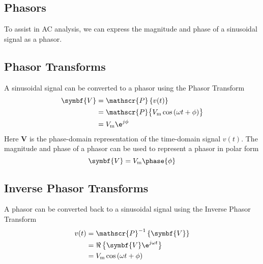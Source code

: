 \documentclass{article}
\begin{document}
\subsection{Phasors}
\begin{definition}
    To assist in AC analysis, we can express the magnitude and phase of a sinusoidal signal
    as a phasor.
\end{definition}
\subsection{Phasor Transforms}
\begin{definition}
    A sinusoidal signal can be converted to a phasor using the Phasor Transform
    \begin{align*}
        \symbf{V} & = \mathscr{P}\left\{ v(t) \right\}                                              \\
                  & = \mathscr{P}\bigl\{ V_{\mathrm{m}}\cos{\left( \omega t + \phi \right)} \bigr\} \\
                  & = V_{\mathrm{m}} \e^{j\phi}
    \end{align*}
    Here $\symbf{V}$ is the phase-domain representation of the
    time-domain signal $v(t)$.
    The magnitude and phase of a phasor can be used to represent a phasor in polar form
    \begin{equation*}
        \symbf{V} = V_{\mathrm{m}} \phase{\phi}
    \end{equation*}
\end{definition}
\subsection{Inverse Phasor Transforms}
\begin{definition}
    A phasor can be converted back to a sinusoidal signal using the Inverse Phasor Transform
    \begin{align*}
        v(t) & = \mathscr{P}^{-1}\left\{ \symbf{V} \right\}                             \\
             & = \Re\left\{ \symbf{V} \e^{j\omega t} \right\}                           \\
             & = V_{\mathrm{m}}\cos{\left( \omega t + \phi \right)}                     
    \end{align*}
\end{definition}
\end{document}
